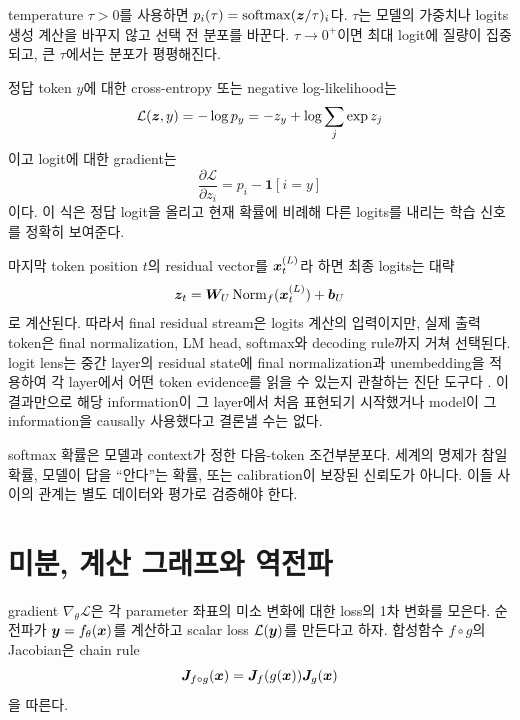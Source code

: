 temperature $\tau>0$를 사용하면 $p_i(\tau)=\operatorname{softmax}(\bm{z}/\tau)_i$다.
$\tau$는 모델의 가중치나 logits 생성 계산을 바꾸지 않고 선택 전 분포를 바꾼다.
$\tau\to0^+$이면 최대 logit에 질량이 집중되고, 큰 $\tau$에서는 분포가 평평해진다.

정답 token $y$에 대한 cross-entropy 또는 negative log-likelihood는
\begin{equation}
  \mathcal{L}(\bm{z},y)=-\log p_y
  =-z_y+\log\sum_j\exp z_j
\end{equation}
이고 logit에 대한 gradient는
\begin{equation}
  \frac{\partial\mathcal{L}}{\partial z_i}=p_i-\mathbf{1}[i=y]
\end{equation}
이다.
이 식은 정답 logit을 올리고 현재 확률에 비례해 다른 logits를 내리는 학습 신호를 정확히 보여준다.

마지막 token position $t$의 residual vector를 $\bm{x}^{(L)}_t$라 하면 최종 logits는 대략
\begin{equation}
  \bm{z}_t
  =\bm{W}_U\operatorname{Norm}_f(\bm{x}^{(L)}_t)+\bm{b}_U
\end{equation}
로 계산된다.
따라서 final residual stream은 logits 계산의 입력이지만, 실제 출력 token은 final normalization, LM head, softmax와 decoding rule까지 거쳐 선택된다.
logit lens는 중간 layer의 residual state에 final normalization과 unembedding을 적용하여 각 layer에서 어떤 token evidence를 읽을 수 있는지 관찰하는 진단 도구다 \citep{belrose2023tunedlens}.
이 결과만으로 해당 information이 그 layer에서 처음 표현되기 시작했거나 model이 그 information을 causally 사용했다고 결론낼 수는 없다.

\begin{factbox}
softmax 확률은 모델과 context가 정한 다음-token 조건부분포다.
세계의 명제가 참일 확률, 모델이 답을 ``안다''는 확률, 또는 calibration이 보장된 신뢰도가 아니다.
이들 사이의 관계는 별도 데이터와 평가로 검증해야 한다.
\end{factbox}

\section{미분, 계산 그래프와 역전파}

gradient $\nabla_{\theta}\mathcal{L}$은 각 parameter 좌표의 미소 변화에 대한 loss의 1차 변화를 모은다.
순전파가 $\bm{y}=f_{\theta}(\bm{x})$를 계산하고 scalar loss $\mathcal{L}(\bm{y})$를 만든다고 하자.
합성함수 $f\circ g$의 Jacobian은 chain rule
\begin{equation}
  \bm{J}_{f\circ g}(\bm{x})
  =\bm{J}_f(g(\bm{x}))\bm{J}_g(\bm{x})
\end{equation}
을 따른다.

